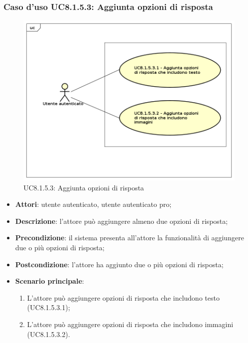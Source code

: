 \subsubsection{Caso d'uso UC8.1.5.3: Aggiunta opzioni di risposta}
	\label{UC8.1.5.3}
	\begin{figure}[h]
		\centering
			\includegraphics[scale=0.45,keepaspectratio]{UML/UC8_1_5_3.png}
		\caption{UC8.1.5.3: Aggiunta opzioni di risposta}
	\end{figure}
	\FloatBarrier
	\begin{itemize}
		\item
			\textbf{Attori}: utente autenticato, utente autenticato pro;
		\item		
			\textbf{Descrizione}: l'attore può aggiungere almeno due opzioni di risposta;
		\item
			\textbf{Precondizione}: il sistema presenta all'attore la funzionalità di aggiungere due o più opzioni di risposta; 
		\item
			\textbf{Postcondizione}: l'attore ha aggiunto due o più opzioni di risposta;
		\item
			\textbf{Scenario principale}:
	       		\begin{enumerate}
	       			\item
	       			L'attore può aggiungere opzioni di risposta che includono testo (UC8.1.5.3.1);
					\item
					L'attore può aggiungere opzioni di risposta che includono immagini (UC8.1.5.3.2).
	 			\end{enumerate}
	\end{itemize}	

